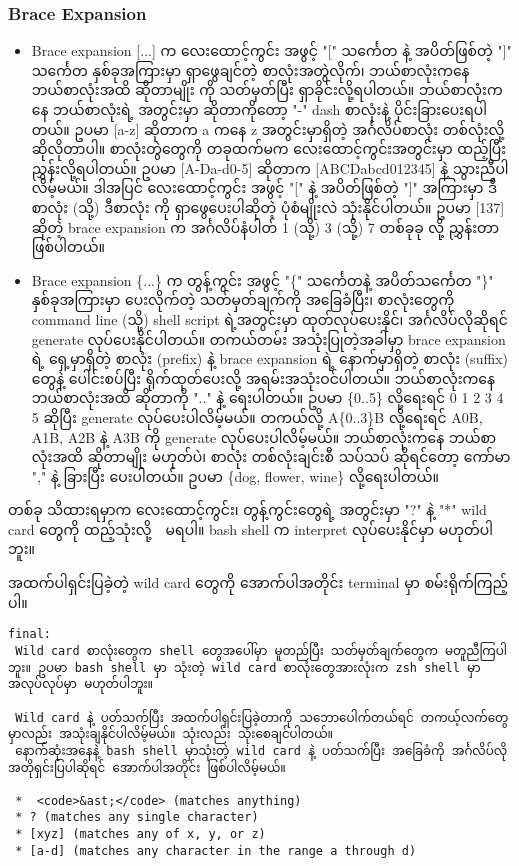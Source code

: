 \documentclass[11pt]{article}
\begin{document}
\subsubsection{Brace Expansion}\label{brace-expansion}

\begin{itemize}
\item
  Brace expansion {[}...{]} က လေးထောင့်ကွင်း အဖွင့် "{[}" သင်္ကေတ နဲ့
  အပိတ်ဖြစ်တဲ့ "{]}" သင်္ကေတ နှစ်ခုအကြားမှာ ရှာဖွေချင်တဲ့
  စာလုံးအတွဲလိုက်၊ ဘယ်စာလုံးကနေ ဘယ်စာလုံးအထိ ဆိုတာမျိုး ကို သတ်မှတ်ပြီး
  ရှာခိုင်းလို့ရပါတယ်။ ဘယ်စာလုံးကနေ ဘယ်စာလုံးရဲ့ အတွင်းမှာ ဆိုတာကိုတော့
  "-" dash စာလုံးနဲ့ ပိုင်းခြားပေးရပါတယ်။ ဥပမာ {[}a-z{]} ဆိုတာက a ကနေ z
  အတွင်းမှာရှိတဲ့ အင်္ဂလိပ်စာလုံး တစ်လုံးလို့ ဆိုလိုတာပါ။
  စာလုံးတွဲတွေကို တခုထက်မက လေးထောင့်ကွင်းအတွင်းမှာ ထည့်ပြီး
  ညွှန်းလို့ရပါတယ်။ ဥပမာ {[}A-Da-d0-5{]} ဆိုတာက {[}ABCDabcd012345{]} နဲ့
  သွားညီပါလိမ့်မယ်။ ဒါအပြင် လေးထောင့်ကွင်း အဖွင့် "{[}" နဲ့ အပိတ်ဖြစ်တဲ့
  "{]}" အကြားမှာ ဒီစာလုံး (သို့) ဒီစာလုံး ကို ရှာဖွေပေးပါဆိုတဲ့
  ပုံစံမျိုးလဲ သုံးနိုင်ပါတယ်။ ဥပမာ {[}137{]} ဆိုတဲ့ brace expansion က
  အင်္ဂလိပ်နံပါတ် 1 (သို့) 3 (သို့) 7 တစ်ခုခု လို့ ညွှန်းတာဖြစ်ပါတယ်။
\item
  Brace expansion \{...\} က တွန့်ကွင်း အဖွင့် "\{" သင်္ကေတနဲ့
  အပိတ်သင်္ကေတ "\}" နှစ်ခုအကြားမှာ ပေးလိုက်တဲ့ သတ်မှတ်ချက်ကို
  အခြေခံပြီး၊ စာလုံးတွေကို command line (သို့) shell script ရဲ့အတွင်းမှာ
  ထုတ်လုပ်ပေးနိုင်၊ အင်္ဂလိပ်လိုဆိုရင် generate လုပ်ပေးနိုင်ပါတယ်။
  တကယ်တမ်း အသုံးပြုတဲ့အခါမှာ brace expansion ရဲ့ ရှေ့မှာရှိတဲ့ စာလုံး
  (prefix) နဲ့ brace expansion ရဲ့ နောက်မှာရှိတဲ့ စာလုံး (suffix) တွေနဲ့
  ပေါင်းစပ်ပြီး ရိုက်ထုတ်ပေးလို့ အရမ်းအသုံးဝင်ပါတယ်။ ဘယ်စာလုံးကနေ
  ဘယ်စာလုံးအထိ ဆိုတာကို ".." နဲ့ ရေးပါတယ်။ ဥပမာ \{0..5\} လို့ရေးရင် 0 1
  2 3 4 5 ဆိုပြီး generate လုပ်ပေးပါလိမ့်မယ်။ တကယ်လို့ A\{0..3\}B
  လို့ရေးရင် A0B, A1B, A2B နဲ့ A3B ကို generate လုပ်ပေးပါလိမ့်မယ်။
  ဘယ်စာလုံးကနေ ဘယ်စာလုံးအထိ ဆိုတာမျိုး မဟုတ်ပဲ၊ စာလုံး တစ်လုံးချင်းစီ
  သပ်သပ် ဆိုရင်တော့ ကော်မာ "," နဲ့ ခြားပြီး ပေးပါတယ်။ ဥပမာ \{dog,
  flower, wine\} လို့ရေးပါတယ်။
\end{itemize}

တစ်ခု သိထားရမှာက လေးထောင့်ကွင်း၊ တွန့်ကွင်းတွေရဲ့ အတွင်းမှာ "?" နဲ့ "*"
wild card တွေကို ထည့်သုံးလို့　မရပါ။ bash shell က interpret
လုပ်ပေးနိုင်မှာ မဟုတ်ပါဘူး။

အထက်ပါရှင်းပြခဲ့တဲ့ wild card တွေကို အောက်ပါအတိုင်း terminal မှာ
စမ်းရိုက်ကြည့်ပါ။

\begin{verbatim}
final:
 Wild card စာလုံးတွေက shell တွေအပေါ်မှာ မူတည်ပြီး သတ်မှတ်ချက်တွေက မတူညီကြပါဘူး။ ဥပမာ bash shell မှာ သုံးတဲ့ wild card စာလုံးတွေအားလုံးက zsh shell မှာ အလုပ်လုပ်မှာ မဟုတ်ပါဘူး။ 
 
 Wild card နဲ့ ပတ်သက်ပြီး အထက်ပါရှင်းပြခဲ့တာကို သဘောပေါက်တယ်ရင် တကယ့်လက်တွေမှာလည်း အသုံးချနိုင်ပါလိမ့်မယ်။ သုံးလည်း သုံးစေချင်ပါတယ်။  
 နောက်ဆုံးအနေနဲ့ bash shell မှာသုံးတဲ့ wild card နဲ့ ပတ်သက်ပြီး အခြေခံကို အင်္ဂလိပ်လို အတိုရှင်းပြပါဆိုရင် အောက်ပါအတိုင်း ဖြစ်ပါလိမ့်မယ်။
 
 *  <code>&ast;</code> (matches anything)
 * ? (matches any single character) 
 * [xyz] (matches any of x, y, or z)
 * [a-d] (matches any character in the range a through d) 
\end{verbatim}
\end{document}
